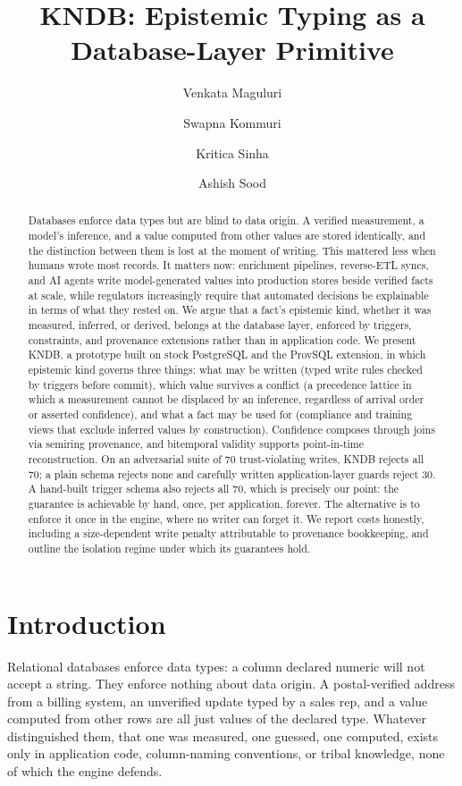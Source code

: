 \documentclass[sigconf,nonacm]{acmart}
\author{Venkata Maguluri}
\affiliation{%
  \institution{Independent Researcher}
  \city{Bentonville, Arkansas}
  \country{USA}}
\author{Swapna Kommuri}
\affiliation{%
  \institution{Independent Researcher}
  \city{Bentonville, Arkansas}
  \country{USA}}
\author{Kritica Sinha}
\affiliation{%
  \institution{Independent Researcher}
  \city{Herndon, Virginia}
  \country{USA}}
\author{Ashish Sood}
\affiliation{%
  \institution{Independent Researcher}
  \city{Bothell, Washington}
  \country{USA}}
\title[KNDB]{KNDB: Epistemic Typing as a Database-Layer Primitive}
\begin{document}
\begin{abstract}
Databases enforce data types but are blind to data origin. A verified measurement, a model's inference, and a value computed from other values are stored identically, and the distinction between them is lost at the moment of writing. This mattered less when humans wrote most records. It matters now: enrichment pipelines, reverse-ETL syncs, and AI agents write model-generated values into production stores beside verified facts at scale, while regulators increasingly require that automated decisions be explainable in terms of what they rested on. We argue that a fact's epistemic kind, whether it was measured, inferred, or derived, belongs at the database layer, enforced by triggers, constraints, and provenance extensions rather than in application code. We present KNDB, a prototype built on stock PostgreSQL and the ProvSQL extension, in which epistemic kind governs three things: what may be written (typed write rules checked by triggers before commit), which value survives a conflict (a precedence lattice in which a measurement cannot be displaced by an inference, regardless of arrival order or asserted confidence), and what a fact may be used for (compliance and training views that exclude inferred values by construction). Confidence composes through joins via semiring provenance, and bitemporal validity supports point-in-time reconstruction. On an adversarial suite of 70 trust-violating writes, KNDB rejects all 70; a plain schema rejects none and carefully written application-layer guards reject 30. A hand-built trigger schema also rejects all 70, which is precisely our point: the guarantee is achievable by hand, once, per application, forever. The alternative is to enforce it once in the engine, where no writer can forget it. We report costs honestly, including a size-dependent write penalty attributable to provenance bookkeeping, and outline the isolation regime under which its guarantees hold.
\end{abstract}

\maketitle

\section{Introduction}
Relational databases enforce data types: a column declared numeric will not accept a string. They enforce nothing about data origin. A postal-verified address from a billing system, an unverified update typed by a sales rep, and a value computed from other rows are all just values of the declared type. Whatever distinguished them, that one was measured, one guessed, one computed, exists only in application code, column-naming conventions, or tribal knowledge, none of which the engine defends.
\end{document}
